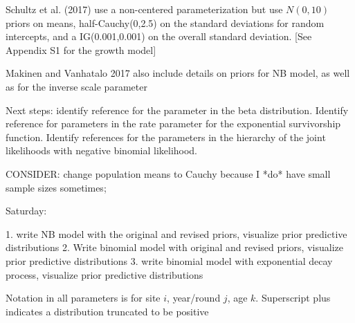 \documentclass[12pt, oneside, titlepage]{article}   	%
\begin{document}
Schultz et al. (2017) use a non-centered parameterization but use $N(0,10)$ priors on means, half-Cauchy(0,2.5) on the standard deviations for random intercepts, and a IG(0.001,0.001) on the overall standard deviation. [See Appendix S1 for the growth model]


Makinen and Vanhatalo 2017 also include details on priors for NB model, as well as for the inverse scale parameter

Next steps: identify reference for the parameter in the beta distribution. Identify reference for parameters in the rate parameter for the exponential survivorship function. Identify references for the parameters in the hierarchy of the joint likelihoods with negative binomial likelihood. 

CONSIDER: change population means to Cauchy because I *do* have small sample sizes sometimes; 

Saturday:

1. write NB model with the original and revised priors, visualize prior predictive distributions
2. Write binomial model with original and revised priors, visualize prior predictive distributions
3. write binomial model with exponential decay process, visualize prior predictive distributions

Notation in all parameters is for site $i$, year/round $j$, age $k$. Superscript plus indicates a distribution truncated to be positive

\footnotesize
\end{document}
